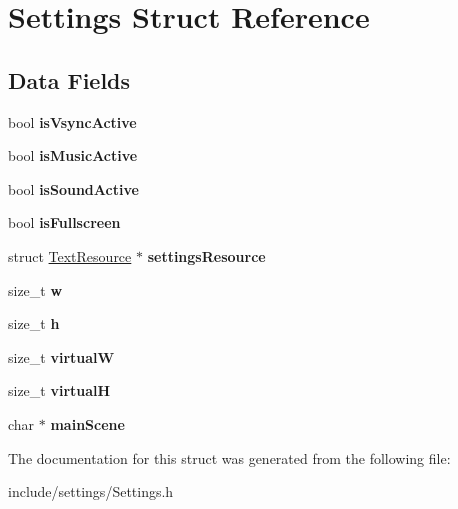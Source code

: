 \hypertarget{struct_settings}{}\section{Settings Struct Reference}
\label{struct_settings}
\subsection*{Data Fields}
\begin{DoxyCompactItemize}
\item 
\hypertarget{struct_settings_a268770171cd0fa68cd268fa1b0ee8c6a}{}\label{struct_settings_a268770171cd0fa68cd268fa1b0ee8c6a} 
bool {\bfseries is\+Vsync\+Active}
\item 
\hypertarget{struct_settings_abc26db848e0a6faf8a443fefaeb42f50}{}\label{struct_settings_abc26db848e0a6faf8a443fefaeb42f50} 
bool {\bfseries is\+Music\+Active}
\item 
\hypertarget{struct_settings_a5c6626343a76aeeea67da93f5e14fd45}{}\label{struct_settings_a5c6626343a76aeeea67da93f5e14fd45} 
bool {\bfseries is\+Sound\+Active}
\item 
\hypertarget{struct_settings_acf2d18d9a8396938ecf48c975f249e71}{}\label{struct_settings_acf2d18d9a8396938ecf48c975f249e71} 
bool {\bfseries is\+Fullscreen}
\item 
\hypertarget{struct_settings_a9f3a9508bd2e43d9a051067b855f3f4f}{}\label{struct_settings_a9f3a9508bd2e43d9a051067b855f3f4f} 
struct \hyperlink{struct_text_resource}{Text\+Resource} $\ast$ {\bfseries settings\+Resource}
\item 
\hypertarget{struct_settings_a48fb479f577f4e88da921cb511d29d87}{}\label{struct_settings_a48fb479f577f4e88da921cb511d29d87} 
size\+\_\+t {\bfseries w}
\item 
\hypertarget{struct_settings_a546c9e6b0a432bcc3cca32e80295a124}{}\label{struct_settings_a546c9e6b0a432bcc3cca32e80295a124} 
size\+\_\+t {\bfseries h}
\item 
\hypertarget{struct_settings_adc24b464ceae12a03474e25a85a79975}{}\label{struct_settings_adc24b464ceae12a03474e25a85a79975} 
size\+\_\+t {\bfseries virtualW}
\item 
\hypertarget{struct_settings_a8b22abb35f29c94a6c569ac06eee9cf9}{}\label{struct_settings_a8b22abb35f29c94a6c569ac06eee9cf9} 
size\+\_\+t {\bfseries virtualH}
\item 
\hypertarget{struct_settings_a792a805526649e9370c1227e7f72ffd2}{}\label{struct_settings_a792a805526649e9370c1227e7f72ffd2} 
char $\ast$ {\bfseries main\+Scene}
\end{DoxyCompactItemize}


The documentation for this struct was generated from the following file\+:\begin{DoxyCompactItemize}
\item 
include/settings/Settings.\+h\end{DoxyCompactItemize}
